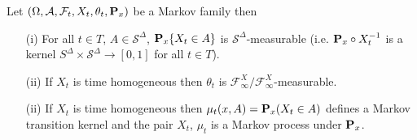 \begin{prop} Let $(\Omega, \mathcal{A}, \mathcal{F}_t, X_t, \theta_t, \probabilityop_x)$ be a Markov family then
\begin{itemize}
\item[(i)]For all $t \in T$, $A \in \mathcal{S}^\Delta$, $\sprobability{X_t \in A}{x}$ is $\mathcal{S}^\Delta$-measurable (i.e. $\pushforward{X_t}{\probabilityop_x}$ is a kernel $S^\Delta \times \mathcal{S}^\Delta \to [0,1]$ for all $t \in T$).
\item[(ii)] If $X_t$ is time homogeneous then $\theta_t$ is $\mathcal{F}^X_\infty/\mathcal{F}^X_\infty$-measurable.
\item[(ii)] If $X_t$ is time homogeneous then $\mu_t(x,A) = \probabilityop_x(X_t \in A)$ defines a Markov transition kernel and the pair $X_t$, $\mu_t$ is a Markov process under $\probabilityop_x$.
\end{itemize}
\end{prop}
